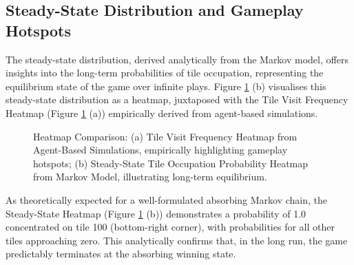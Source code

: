\subsection{Steady-State Distribution and Gameplay Hotspots}

The steady-state distribution, derived analytically from the Markov model, offers insights into the long-term probabilities of tile occupation, representing the equilibrium state of the game over infinite plays. Figure \ref{fig:steady_state_heatmap_chapter3} (b) visualises this steady-state distribution as a heatmap, juxtaposed with the Tile Visit Frequency Heatmap (Figure \ref{fig:steady_state_heatmap_chapter3} (a)) empirically derived from agent-based simulations.

\begin{figure}[ht]
	\centering
	\caption{Heatmap Comparison: (a) Tile Visit Frequency Heatmap from Agent-Based Simulations, empirically highlighting gameplay hotspots; (b) Steady-State Tile Occupation Probability Heatmap from Markov Model, illustrating long-term equilibrium.}
	\label{fig:steady_state_heatmap_chapter3}
\end{figure}

As theoretically expected for a well-formulated absorbing Markov chain, the Steady-State Heatmap (Figure \ref{fig:steady_state_heatmap_chapter3} (b)) demonstrates a probability of 1.0 concentrated on tile 100 (bottom-right corner), with probabilities for all other tiles approaching zero. This analytically confirms that, in the long run, the game predictably terminates at the absorbing winning state.


